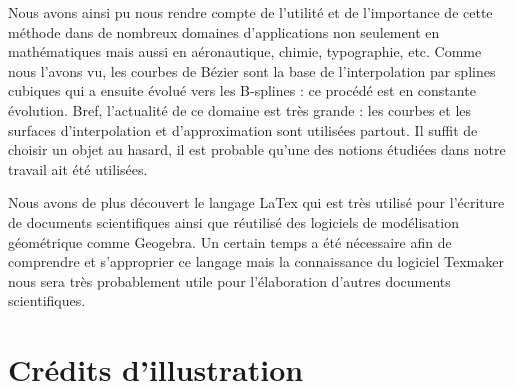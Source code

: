 \documentclass{article}
\begin{document}
	Nous avons ainsi pu nous rendre compte de l'utilit\'{e} et de l'importance de cette m\'{e}thode dans de nombreux domaines d'applications non seulement en math\'{e}matiques mais aussi en a\'{e}ronautique, chimie, typographie, etc. Comme nous l'avons vu, les courbes de B\'{e}zier sont la base de l'interpolation par splines cubiques qui a ensuite \'{e}volu\'{e} vers les B-splines : ce proc\'{e}d\'{e} est en constante \'{e}volution.  Bref, l'actualit\'{e} de ce domaine est tr\`{e}s grande : les courbes et les surfaces d'interpolation et d'approximation sont utilis\'{e}es partout. Il suffit de choisir un objet au hasard, il est probable qu'une des notions \'{e}tudi\'{e}es dans notre travail ait \'{e}t\'{e} utilis\'{e}es.
\

	Nous avons de plus d\'{e}couvert le langage LaTex qui est tr\`{e}s utilis\'{e} pour l'\'{e}criture de documents scientifiques ainsi que r\'{e}utilis\'{e} des logiciels de mod\'{e}lisation g\'{e}om\'{e}trique comme Geogebra. Un certain temps a \'{e}t\'{e} n\'{e}cessaire afin de comprendre et s'approprier ce langage mais la connaissance du logiciel Texmaker nous sera tr\`{e}s probablement utile pour l'\'{e}laboration d'autres documents scientifiques.

\newpage
\section{Cr\'{e}dits d'illustration}
\end{document}
